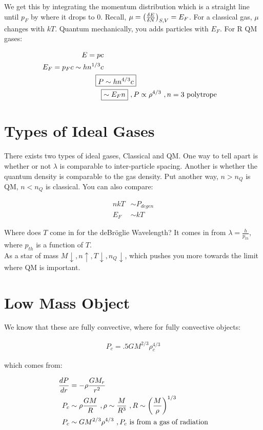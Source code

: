 We get this by integrating the momentum distribution which is a straight line until $p_F$ by where it drops to 0. Recall, $\mu = \left( \frac{\delta E}{\delta N} \right)_{S,V} = E_F$. For a classical gas, $\mu$ changes with $kT$. Quantum mechanically, you adds particles with $E_F$. For R QM gases:

\begin{align}
E = pc\\
E_F = p_F c\sim hn^{1/3}c\\
\Aboxed{P &\sim hn^{4/3}c}\\
\Aboxed{&\sim E_F n}~,P \pt \rho^{4/3}~,n=3\text{ polytrope}
\end{align}

\section{Types of Ideal Gases}

There exists two types of ideal gases, Classical and QM. One way to tell apart is whether or not $\lambda$ is comparable to inter-particle spacing. Another is whether the quantum density is comparable to the gas density. Put another way, $n > n_Q$ is QM, $n < n_Q$ is classical. You can also compare:

\begin{align}
nkT &\sim P_{degen}\\
E_F& \sim kT
\end{align}

Where does $T$ come in for the deBr\"oglie Wavelength? It comes in from $\lambda = \frac{h}{p_{th}}$, where $p_{th}$ is a function of $T$.\\

As a star of mass $M \downarrow, n\uparrow, T \downarrow, n_Q \downarrow$, which pushes you more towards the limit where QM is important. 

\section{Low Mass Object}

We know that these are fully convective, where for fully convective objects:

\begin{align}
P_c = .5 GM^{2/3}\rho_c^{4/3}
\end{align}

which comes from:

\begin{align}
\frac{dP}{dr} &= -\rho \frac{GM_r}{r^2}\\
P_c &\sim \rho \frac{GM}{R}~,\rho \sim \frac{M}{R^3}~,R \sim \left( \frac{M}{\rho} \right)^{1/3}\\
P_c &\sim GM^{2/3}\rho^{4/3}~,P_c \text{ is from a gas of radiation}
\end{align}

